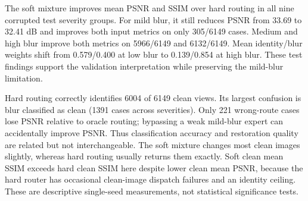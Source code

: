 The soft mixture improves mean PSNR and SSIM over hard routing in all nine corrupted test severity groups. For mild blur, it still reduces PSNR from 33.69 to 32.41 dB and improves both input metrics on only 305/6149 cases. Medium and high blur improve both metrics on 5966/6149 and 6132/6149. Mean identity/blur weights shift from 0.579/0.400 at low blur to 0.139/0.854 at high blur. These test findings support the validation interpretation while preserving the mild-blur limitation.

Hard routing correctly identifies 6004 of 6149 clean views. Its largest confusion is blur classified as clean (1391 cases across severities). Only 221 wrong-route cases lose PSNR relative to oracle routing; bypassing a weak mild-blur expert can accidentally improve PSNR. Thus classification accuracy and restoration quality are related but not interchangeable. The soft mixture changes most clean images slightly, whereas hard routing usually returns them exactly. Soft clean mean SSIM exceeds hard clean SSIM here despite lower clean mean PSNR, because the hard router has occasional clean-image dispatch failures and an identity ceiling. These are descriptive single-seed measurements, not statistical significance tests.

